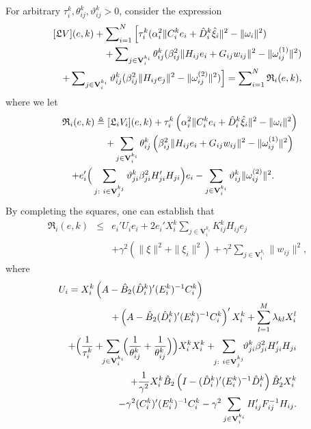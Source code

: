 \documentclass[a4paper,twocolumn]{autart}
\begin{document}
For arbitrary $\tau_i^k,\theta_{ij}^k,\vartheta_{ij}^k>0$, consider the expression
\begin{eqnarray*} 
\lefteqn{[\mathfrak{L}V](e,k)
+ \sum\nolimits_{i=1}^N\Big[
  \tau_i^k(\alpha_i^2 \|C_i^k e_i+\hat D_i^k\hat
  \xi_i\|^2-\|\omega_i\|^2)} && \nonumber \\
&& 
+\sum\nolimits_{j\in\mathbf{V}_i^{k_i}}\theta_{ij}^k(\beta_{ij}^2\|H_{ij}e_i+G_{ij}w_{ij}\|^2-\|\omega_{ij}^{(1)}\|^2)\nonumber \\
&&+\sum\nolimits_{j\in\mathbf{V}_i^{k_i}}\vartheta_{ij}^k(\beta_{ij}^2\|H_{ij}e_j\|^2-\|\omega_{ij}^{(2)}\|^2)\Big]
=
\sum\nolimits_{i=1}^N\mathfrak{R}_i(e,k), 
\end{eqnarray*}
where we let
\begin{eqnarray}
\lefteqn{\mathfrak{R}_i(e,k)\triangleq [\mathfrak{L}_iV_i](e,k) 
  + \tau_i^k\left(\alpha_i^2 \|C_i^k e_i+\hat D_i^k\hat
  \xi_i\|^2-\|\omega_i\|^2\right)} && \nonumber \\
&& 
+\sum_{j\in\mathbf{V}_i^{k_i}}\theta_{ij}^k\left(\beta_{ij}^2\|H_{ij}e_i+G_{ij}w_{ij}\|^2-\|\omega_{ij}^{(1)}\|^2\right)\nonumber \\
&& 
+e_i'\Big(\sum_{j:~
    i\in\mathbf{V}_j^{k_j}}\vartheta_{ji}^k\beta_{ji}^2H_{ji}'H_{ji}\Big)e_i-
\sum_{j\in\mathbf{V}_i^{k_i}}\vartheta_{ij}^k\|\omega_{ij}^{(2)}\|^2. \qquad 
\label{LV.1}
\end{eqnarray}
By completing the squares, one can establish that  
\begin{eqnarray}
\mathfrak{R}_i(e,k)&\le& e_i'U_ie_i+2e_i'X_i^k\sum_{j\in
  \mathbf{V}_i^{k_i}}K_{ij}^kH_{ij}e_j \nonumber \\
&& +\gamma^2(\|\xi\|^2+\|\xi_i\|^2)+ \gamma^2\sum_{j\in
  \mathbf{V}_i^{k_i}}\|w_{ij}\|^2, \label{Rem.2}
\end{eqnarray}
where 
\begin{eqnarray*}
\lefteqn{U_i=X_i^k\left(A-\hat B_2(\hat D_i^k)'(E_i^k)^{-1}C_i^k\right)} &&\\
&&+\left(A-\hat B_2(\hat D_i^k)'(E_i^k)^{-1}C_i^k\right)'
X_i^k+\sum_{l=1}^M\lambda_{kl}X_i^l 
\nonumber \\
&&+\Big(\frac{1}{\tau_i^k}+\!\!\sum_{j\in\mathbf{V}_i^{k_i}}\!\!\Big(\frac{1}{\theta_{ij}^k}+\frac{1}{\theta_{ij}^k}\Big)\Big)X_i^kX_i^k+\!\!\sum_{j:~
    i\in\mathbf{V}_j^{k_j}}\!\!\vartheta_{ji}^k\beta_{ji}^2H_{ji}'H_{ji} 
\\
&&+\frac{1}{\gamma^2}X_i^k
\hat B_2\left(I-(\hat D_i^k)'(E_i^k)^{-1} \hat
    D_i^k\right)\hat B_2'X_i^k 
 \nonumber \\
&&-\gamma^2(C_i^k)'(E_i^k)^{-1}C_i^k
-\gamma^2\sum_{j\in\mathbf{V}_i^{k_i}}H_{ij}'F_{ij}^{-1}H_{ij}.
  \label{Ui}
\end{eqnarray*}
\end{document}

